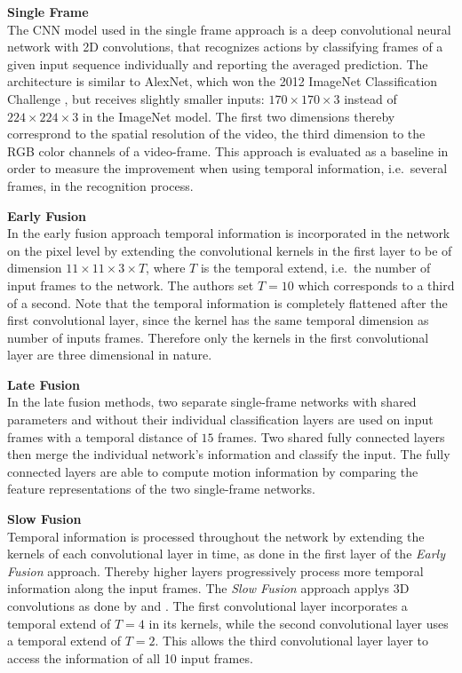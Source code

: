 \textbf{Single Frame}\\
The CNN model used in the single frame approach is a deep convolutional neural network with 2D convolutions, that recognizes actions by classifying frames of a given input sequence individually and reporting the averaged prediction.
The architecture is similar to AlexNet, which won the 2012 ImageNet Classification Challenge \cite{krizhevsky_imagenet_2012-1}, but receives slightly smaller inputs: $170\times170\times3$ instead of $224\times224\times3$ in the ImageNet model.
The first two dimensions thereby corresprond to the spatial resolution of the video, the third dimension to the RGB color channels of a video-frame.
This approach is evaluated as a baseline in order to measure the improvement when using temporal information, i.e.\ several frames, in the recognition process. 

\textbf{Early Fusion}\\
In the early fusion approach temporal information is incorporated in the network on the pixel level by extending the convolutional kernels in the first layer to be of dimension $11 \times 11 \times 3 \times T$, where $T$ is the temporal extend, i.e.\ the number of input frames to the network.
The authors set $T = 10$ which corresponds to a third of a second.
Note that the temporal information is completely flattened after the first convolutional layer, since the kernel has the same temporal dimension as number of inputs frames.
Therefore only the kernels in the first convolutional layer are three dimensional in nature.

\textbf{Late Fusion}\\
In the late fusion methods, two separate single-frame networks with shared parameters and without their individual classification layers are used on input frames with a temporal distance of $15$ frames.
Two shared fully connected layers then merge the individual network's information and classify the input. 
The fully connected layers are able to compute motion information by comparing the feature representations of the two single-frame networks.

\textbf{Slow Fusion}\\
Temporal information is processed throughout the network by extending the kernels of each convolutional layer in time, as done in the first layer of the \textit{Early Fusion} approach.
Thereby higher layers progressively process more temporal information along the input frames.
The \textit{Slow Fusion} approach applys 3D convolutions as done by \textcite{ji_3d_2013} and \textcite{baccouche_sequential_2011}.
The first convolutional layer incorporates a temporal extend of $T = 4$ in its kernels, while the second convolutional layer uses a temporal extend of $T = 2$.
This allows the third convolutional layer layer to access the information of all 10 input frames.

